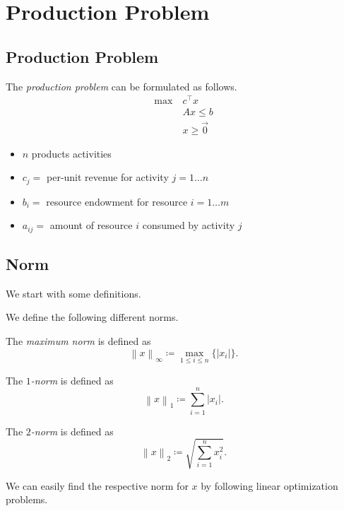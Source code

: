\chapter{Production Problem}
\section{Production Problem}
The \emph{production problem} can be formulated as follows.
\begin{align*}
	\max~ & c^{\top}x     \\
	      & Ax \leq b     \\
	      & x\geq \vec{0}
\end{align*}
\begin{itemize}
	\item \(n\) products activities
	\item \(c_{j}=\) per-unit revenue for activity \(j = 1\ldots n\)
	\item \(b_{i}=\) resource endowment for resource \(i = 1\ldots m\)
	\item \(a_{ij}=\) amount of resource \(i\) consumed by activity \(j\)
\end{itemize}

\section{Norm}
We start with some definitions.
\begin{definition}
	We define the following different norms.
	\begin{definition}\label{def:maximum-norm}
		The \emph{maximum norm} is defined as
		\[
			\left\lVert x\right\rVert_{\infty } \coloneqq \max_{1\leq i \leq n}\{\left\vert x_i \right\vert \}.
		\]
	\end{definition}
	\begin{definition}[\(1\)-norm]\label{def:1-norm}
		The \emph{\(1\)-norm} is defined as
		\[
			\left\lVert x\right\rVert_{1} \coloneqq \sum\limits_{i=1}^{n} \left\vert x_i \right\vert.
		\]
	\end{definition}
	\begin{definition}[\(2\)-norm]\label{def:2-norm}
		The \emph{\(2\)-norm} is defined as
		\[
			\left\lVert x\right\rVert_{2} \coloneqq \sqrt{\sum\limits_{i=1}^{n} x_i^2}.
		\]
	\end{definition}
\end{definition}

We can easily find the respective norm for \(x\) by following linear optimization problems.

